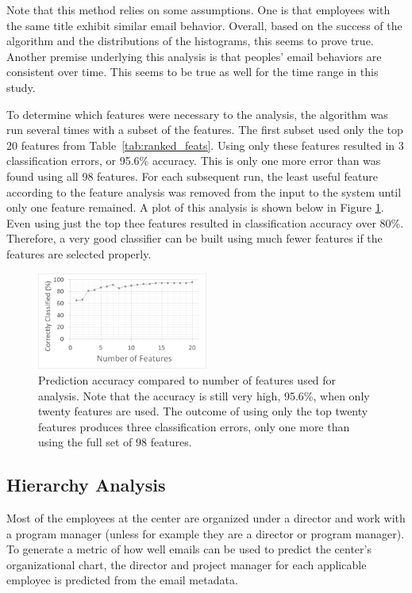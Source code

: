\documentclass{article}
\begin{document}
Note that this method relies on some assumptions.  One is that employees with the same title exhibit similar email behavior.  Overall, based on the success of the algorithm and the distributions of the histograms, this seems to prove true.  Another premise underlying this analysis is that peoples' email behaviors are consistent over time.  This seems to be true as well for the time range in this study.

To determine which features were necessary to the analysis, the algorithm was run several times with a subset of the features.  The first subset used only the top 20 features from Table~\ref{tab:ranked_feats}.  Using only these features resulted in 3 classification errors, or 95.6\% accuracy.  This is only one more error than was found using all 98 features.  For each subsequent run, the least useful feature according to the feature analysis was removed from the input to the system until only one feature remained.  A plot of this analysis is shown below in Figure \ref{fig:feat_analysis}.  Even using just the top thee features resulted in classification accuracy over 80\%.  Therefore, a very good classifier can be built using much fewer features if the features are selected properly.
\begin{figure}[H]
    \centering
        \includegraphics[width=0.5\textwidth]{FeatureAnalysis}
        \caption{Prediction accuracy compared to number of features used for analysis.  Note that the accuracy is still very high, 95.6\%, when only twenty features are used.  The outcome of using only the top twenty features produces three classification errors, only one more than using the full set of 98 features. }
        \label{fig:feat_analysis}
\end{figure}

\subsection{Hierarchy Analysis}
Most of the employees at the center are organized under a director and work with a program manager (unless for example they are a director or program manager).  To generate a metric of how well emails can be used to predict the center's organizational chart, the director and project manager for each applicable employee is predicted from the email metadata. 
\end{document}
